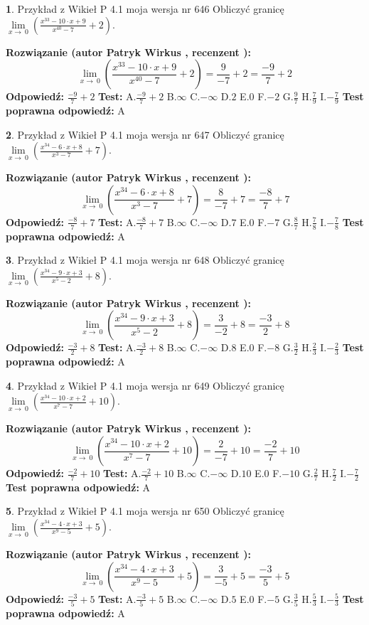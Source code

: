 \documentclass[12pt, a4paper]{article}
\theoremstyle{definition} %
\newtheorem{zad}{}
\newcommand{\zadStart}[1]{\begin{zad}#1\newline}
\newcommand{\zadStop}{\end{zad}}
\newcommand{\rozwStart}[2]{\noindent \textbf{Rozwiązanie (autor #1 , recenzent #2): }\newline}
\newcommand{\rozwStop}{\newline}
\newcommand{\odpStart}{\noindent \textbf{Odpowiedź:}\newline}
\newcommand{\odpStop}{\newline}
\newcommand{\testStart}{\noindent \textbf{Test:}\newline}
\newcommand{\testStop}{\newline}
\newcommand{\kluczStart}{\noindent \textbf{Test poprawna odpowiedź:}\newline}
\newcommand{\kluczStop}{\newline}
\begin{document}
\zadStart{Przykład z Wikieł P 4.1 moja wersja nr 646}
Obliczyć granicę $\lim\limits_{x\to\ 0}(\frac{x^{33}-10 \cdot x +9}{x^{40}-7}+2)$.
\zadStop
\rozwStart{Patryk Wirkus}{}
$$\lim\limits_{x\to\ 0}(\frac{x^{33}-10 \cdot x +9}{x^{40}-7}+2)=\frac{9}{-7}+2=\frac{-9}{7}+2$$
\rozwStop
\odpStart
$\frac{-9}{7}+2$
\odpStop
\testStart
A.$\frac{-9}{7}+2$
B.$\infty$
C.$-\infty$
D.$2$
E.$0$
F.$-2$
G.$\frac{9}{7}$
H.$\frac{7}{9}$
I.$-\frac{7}{9}$
\testStop
\kluczStart
A
\kluczStop



\zadStart{Przykład z Wikieł P 4.1 moja wersja nr 647}
Obliczyć granicę $\lim\limits_{x\to\ 0}(\frac{x^{34}-6 \cdot x +8}{x^{3}-7}+7)$.
\zadStop
\rozwStart{Patryk Wirkus}{}
$$\lim\limits_{x\to\ 0}(\frac{x^{34}-6 \cdot x +8}{x^{3}-7}+7)=\frac{8}{-7}+7=\frac{-8}{7}+7$$
\rozwStop
\odpStart
$\frac{-8}{7}+7$
\odpStop
\testStart
A.$\frac{-8}{7}+7$
B.$\infty$
C.$-\infty$
D.$7$
E.$0$
F.$-7$
G.$\frac{8}{7}$
H.$\frac{7}{8}$
I.$-\frac{7}{8}$
\testStop
\kluczStart
A
\kluczStop



\zadStart{Przykład z Wikieł P 4.1 moja wersja nr 648}
Obliczyć granicę $\lim\limits_{x\to\ 0}(\frac{x^{34}-9 \cdot x +3}{x^{5}-2}+8)$.
\zadStop
\rozwStart{Patryk Wirkus}{}
$$\lim\limits_{x\to\ 0}(\frac{x^{34}-9 \cdot x +3}{x^{5}-2}+8)=\frac{3}{-2}+8=\frac{-3}{2}+8$$
\rozwStop
\odpStart
$\frac{-3}{2}+8$
\odpStop
\testStart
A.$\frac{-3}{2}+8$
B.$\infty$
C.$-\infty$
D.$8$
E.$0$
F.$-8$
G.$\frac{3}{2}$
H.$\frac{2}{3}$
I.$-\frac{2}{3}$
\testStop
\kluczStart
A
\kluczStop



\zadStart{Przykład z Wikieł P 4.1 moja wersja nr 649}
Obliczyć granicę $\lim\limits_{x\to\ 0}(\frac{x^{34}-10 \cdot x +2}{x^{7}-7}+10)$.
\zadStop
\rozwStart{Patryk Wirkus}{}
$$\lim\limits_{x\to\ 0}(\frac{x^{34}-10 \cdot x +2}{x^{7}-7}+10)=\frac{2}{-7}+10=\frac{-2}{7}+10$$
\rozwStop
\odpStart
$\frac{-2}{7}+10$
\odpStop
\testStart
A.$\frac{-2}{7}+10$
B.$\infty$
C.$-\infty$
D.$10$
E.$0$
F.$-10$
G.$\frac{2}{7}$
H.$\frac{7}{2}$
I.$-\frac{7}{2}$
\testStop
\kluczStart
A
\kluczStop



\zadStart{Przykład z Wikieł P 4.1 moja wersja nr 650}
Obliczyć granicę $\lim\limits_{x\to\ 0}(\frac{x^{34}-4 \cdot x +3}{x^{9}-5}+5)$.
\zadStop
\rozwStart{Patryk Wirkus}{}
$$\lim\limits_{x\to\ 0}(\frac{x^{34}-4 \cdot x +3}{x^{9}-5}+5)=\frac{3}{-5}+5=\frac{-3}{5}+5$$
\rozwStop
\odpStart
$\frac{-3}{5}+5$
\odpStop
\testStart
A.$\frac{-3}{5}+5$
B.$\infty$
C.$-\infty$
D.$5$
E.$0$
F.$-5$
G.$\frac{3}{5}$
H.$\frac{5}{3}$
I.$-\frac{5}{3}$
\testStop
\kluczStart
A
\kluczStop
\end{document}
